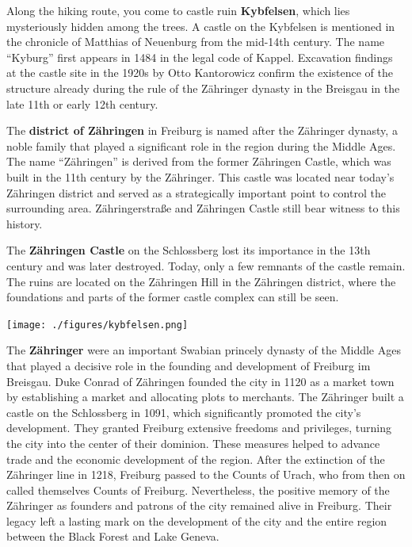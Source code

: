 \documentclass[landscape, a4paper]{article}
\newcommand\alert[1]{\textcolor{PrimaryColor}{\textbf{#1}}}
\begin{document}
\begin{minipage}[t]{0.31\textwidth}
	\setlength{\parskip}{0.25cm}
	\vspace{0cm}

  Along the hiking route, you come to castle ruin \alert{Kybfelsen}, which lies mysteriously hidden among the trees. A castle on the Kybfelsen is mentioned in the chronicle of Matthias of Neuenburg from the mid-14th century. The name \enquote{Kyburg} first appears in 1484 in the legal code of Kappel. Excavation findings at the castle site in the 1920s by Otto Kantorowicz confirm the existence of the structure already during the rule of the Zähringer dynasty in the Breisgau in the late 11th or early 12th century. %

The \alert{district of Zähringen} in Freiburg is named after the Zähringer dynasty, a noble family that played a significant role in the region during the Middle Ages. The name \enquote{Zähringen} is derived from the former Zähringen Castle, which was built in the 11th century by the Zähringer. This castle was located near today’s Zähringen district and served as a strategically important point to control the surrounding area. Zähringerstraße and Zähringen Castle still bear witness to this history.

The \alert{Zähringen Castle} on the Schlossberg lost its importance in the 13th century and was later destroyed. Today, only a few remnants of the castle remain. The ruins are located on the Zähringen Hill in the Zähringen district, where the foundations and parts of the former castle complex can still be seen.

	\texttt{[image: ./figures/kybfelsen.png]}
	\setlength{\parskip}{0.25cm}

  The \alert{Zähringer} were an important Swabian princely dynasty of the Middle Ages that played a decisive role in the founding and development of Freiburg im Breisgau. Duke Conrad of Zähringen founded the city in 1120 as a market town by establishing a market and allocating plots to merchants. The Zähringer built a castle on the Schlossberg in 1091, which significantly promoted the city's development. They granted Freiburg extensive freedoms and privileges, turning the city into the center of their dominion. These measures helped to advance trade and the economic development of the region. After the extinction of the Zähringer line in 1218, Freiburg passed to the Counts of Urach, who from then on called themselves Counts of Freiburg. Nevertheless, the positive memory of the Zähringer as founders and patrons of the city remained alive in Freiburg. Their legacy left a lasting mark on the development of the city and the entire region between the Black Forest and Lake Geneva.


\end{minipage}
\end{document}

